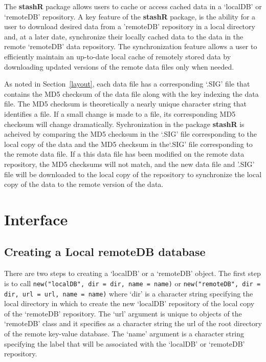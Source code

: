 \documentclass{article}
\newcommand{\pkg}{\textbf}
\newcommand{\code}{\texttt}
\begin{document}
The \pkg{stashR} package allows users
to cache or access cached data in a `localDB' or
`remoteDB' repository. A key feature of the
\pkg{stashR} package, is the ability for a user to download
desired data from a 'remoteDB' repository in a local directory
and, at a later date, synchronize their locally cached data to the
data in the remote `remoteDB' data repository. The synchronization
feature allows a user to efficiently maintain an up-to-date local cache of 
remotely stored data by downloading updated versions of the remote
data files only when needed. 

As noted in Section~\ref{layout}, each data file has a corresponding
`.SIG' file that contains the MD5 checksum of the data file along with 
the key indexing the data file. The MD5 checksum is 
theoretically a nearly unique character string that identifies a file. If a 
small change is made to a file, its corresponding MD5 checksum will change 
dramatically. Sychronization in the package \pkg{stashR} is acheived 
by comparing the MD5 checksum in the `.SIG' file corresponding to the local 
copy of the data and the MD5 checksum in the`.SIG' file corresponding to the 
remote data file. If a this data file has been modified on the remote data
repository, the MD5 checksums will not match, and the new data file and 
'.SIG' file will be downloaded to the local copy of the repository to 
synchronize the local copy of the data to the remote version of the data. 


\section{Interface}

\subsection{Creating a Local remoteDB database}

There are two steps to creating a `localDB' or a `remoteDB'
object. The first step is to call \code{new("localDB", dir = dir, name = name)} 
or \code{new("remoteDB", dir = dir, url = url, name = name)} where 
`dir' is a character string specifying the local directory in which to 
create the new `localDB' repository of the local copy of the 
`remoteDB' repository. The `url' argument is unique to objects of the 
`remoteDB' class and it specifies as a character string the url 
of the root directory of the remote key-value database. The `name' 
argument is a character string specifying the label that will be associated with
the `localDB' or `remoteDB' repository.  
\end{document}
